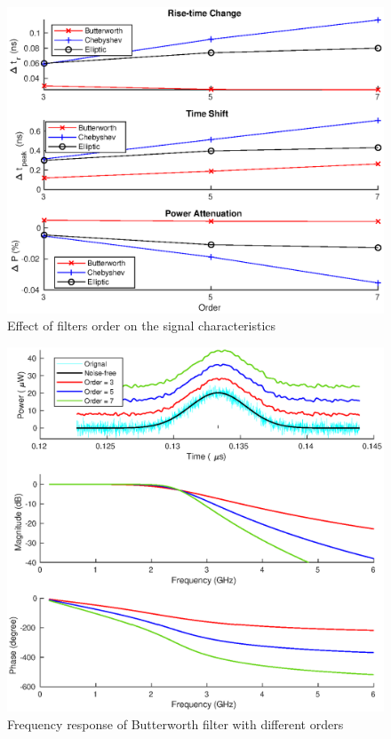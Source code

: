 \begin{figure}[h]
\centering
\includegraphics[width=1\textwidth]{figures/chapter_AFE/Effect_order_diff_filter.eps}
\caption{Effect of filters order on the signal characteristics}
\label{fig:AFE_res_orderEffect}
\end{figure}
\begin{figure}[t!p]
\centering
\includegraphics[width=1\textwidth]{figures/chapter_AFE/freq_response_butter_diffOrder.eps}
\caption{Frequency response of Butterworth filter with different orders}
\label{fig:AFE_freqResp_butter_order}
\end{figure}
